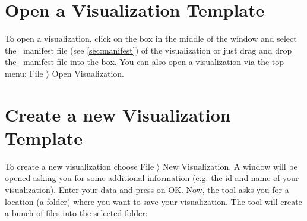 \section{Open a Visualization Template}
\label{open_vis_template}

To open a visualization, click on the box in the middle of the window and select the \bms\ manifest file (see \ref{sec:manifest}) of the visualization or just drag and drop the \bms\ manifest file into the box.
You can also open a visualization via the top menu: \textsf{File $\rangle$ Open Visualization}.

\section{Create a new Visualization Template}
\label{vis_template}

To create a new visualization choose \textsf{File $\rangle$ New Visualization}.
A window will be opened asking you for some additional information (e.g. the id and name of your visualization).
Enter your data and press on OK.
Now, the tool asks you for a location (a folder) where you want to save your visualization.
The tool will create a bunch of files into the selected folder:




